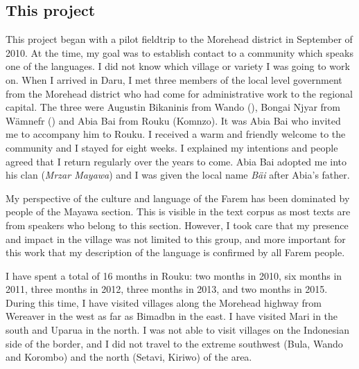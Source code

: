 \subsection{This project}\label{thisproject}

This project began with a pilot fieldtrip to the Morehead district in September of 2010. At the time, my goal was to establish contact to a community which speaks one of the  languages. I did not know which village or variety I was going to work on. When I arrived in Daru, I met three members of the local level government from the Morehead district who had come for administrative work to the regional capital. The three were Augustin Bikaninis from Wando (), Bongai Njyar from Wämnefr () and Abia Bai from Rouku (Komnzo). It was Abia Bai who invited me to accompany him to Rouku. I received a warm and friendly welcome to the community and I stayed for eight weeks. I explained my intentions and people agreed that I return regularly over the years to come. Abia Bai adopted me into his clan (\emph{Mrzar Mayawa}) and I was given the local name \emph{Bäi} after Abia's father.%

My perspective of the culture and language of the Farem has been dominated by people of the Mayawa section. This is visible in the text corpus as most texts are from speakers who belong to this section. However, I took care that my presence and impact in the village was not limited to this group, and {\textendash} more important for this work {\textendash} that my description of the language is confirmed by all Farem people.%

I have spent a total of 16 months in Rouku: two months in 2010, six months in 2011, three months in 2012, three months in 2013, and two months in 2015. During this time, I have visited villages along the Morehead highway from Wereaver in the west as far as Bimadbn in the east. I have visited Mari in the south and Uparua in the north. I was not able to visit villages on the Indonesian side of the border, and I did not travel to the extreme southwest (Bula, Wando and Korombo) and the north (Setavi, Kiriwo) of the area.%

